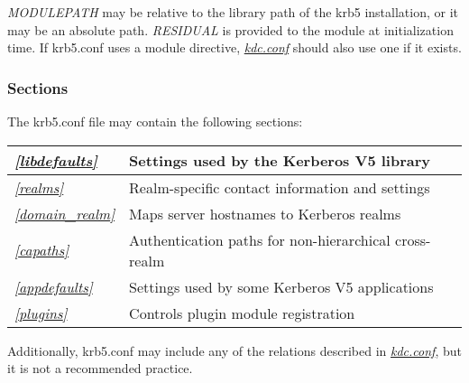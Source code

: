 \documentclass[letterpaper,10pt,english]{sphinxmanual}
\begin{document}
\emph{MODULEPATH} may be relative to the library path of the krb5
installation, or it may be an absolute path.  \emph{RESIDUAL} is provided
to the module at initialization time.  If krb5.conf uses a module
directive, {\hyperref[admin/conf_files/kdc_conf:kdc-conf-5]{\emph{kdc.conf}}} should also use one if it exists.


\subsubsection{Sections}
\label{admin/conf_files/krb5_conf:sections}
The krb5.conf file may contain the following sections:

\begin{tabulary}{\linewidth}{|L|L|}
\hline

{\hyperref[admin/conf_files/krb5_conf:libdefaults]{\emph{{[}libdefaults{]}}}}
 & 
Settings used by the Kerberos V5 library
\\
\hline
{\hyperref[admin/conf_files/krb5_conf:realms]{\emph{{[}realms{]}}}}
 & 
Realm-specific contact information and settings
\\
\hline
{\hyperref[admin/conf_files/krb5_conf:domain-realm]{\emph{{[}domain\_realm{]}}}}
 & 
Maps server hostnames to Kerberos realms
\\
\hline
{\hyperref[admin/conf_files/krb5_conf:capaths]{\emph{{[}capaths{]}}}}
 & 
Authentication paths for non-hierarchical cross-realm
\\
\hline
{\hyperref[admin/conf_files/krb5_conf:appdefaults]{\emph{{[}appdefaults{]}}}}
 & 
Settings used by some Kerberos V5 applications
\\
\hline
{\hyperref[admin/conf_files/krb5_conf:plugins]{\emph{{[}plugins{]}}}}
 & 
Controls plugin module registration
\\
\hline\end{tabulary}


Additionally, krb5.conf may include any of the relations described in
{\hyperref[admin/conf_files/kdc_conf:kdc-conf-5]{\emph{kdc.conf}}}, but it is not a recommended practice.
\end{document}
